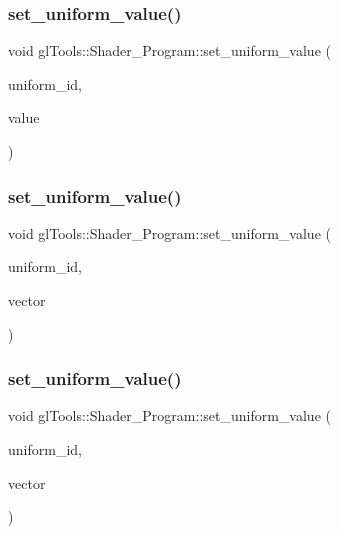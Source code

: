 \subsubsection{set\_uniform\_value()\hspace{0.1cm}{\footnotesize\ttfamily [2/8]}}
{\footnotesize\ttfamily void gl\+Tools\+::\+Shader\+\_\+\+Program\+::set\+\_\+uniform\+\_\+value (\begin{DoxyParamCaption}\item[{G\+Lint}]{uniform\+\_\+id,  }\item[{const float \&}]{value }\end{DoxyParamCaption})\hspace{0.3cm}{\ttfamily [inline]}}

\mbox{\label{classgl_tools_1_1_shader___program_a1f8a9d7d3b03f5c28dbcfb78dce3e48f}} 
\subsubsection{set\_uniform\_value()\hspace{0.1cm}{\footnotesize\ttfamily [3/8]}}
{\footnotesize\ttfamily void gl\+Tools\+::\+Shader\+\_\+\+Program\+::set\+\_\+uniform\+\_\+value (\begin{DoxyParamCaption}\item[{G\+Lint}]{uniform\+\_\+id,  }\item[{const Vector2f \&}]{vector }\end{DoxyParamCaption})\hspace{0.3cm}{\ttfamily [inline]}}

\mbox{\label{classgl_tools_1_1_shader___program_a94181832c9cd1b03e30ee4228b2b87d3}} 
\subsubsection{set\_uniform\_value()\hspace{0.1cm}{\footnotesize\ttfamily [4/8]}}
{\footnotesize\ttfamily void gl\+Tools\+::\+Shader\+\_\+\+Program\+::set\+\_\+uniform\+\_\+value (\begin{DoxyParamCaption}\item[{G\+Lint}]{uniform\+\_\+id,  }\item[{const Vector3f \&}]{vector }\end{DoxyParamCaption})\hspace{0.3cm}{\ttfamily [inline]}}

